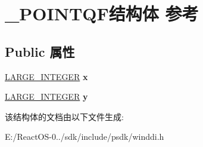 \hypertarget{struct___p_o_i_n_t_q_f}{}\section{\+\_\+\+P\+O\+I\+N\+T\+Q\+F结构体 参考}
\label{struct___p_o_i_n_t_q_f}
\subsection*{Public 属性}
\begin{DoxyCompactItemize}
\item 
\mbox{\label{struct___p_o_i_n_t_q_f_ad7731ff4f41bc4162e21bd167a15c81c}} 
\hyperlink{union___l_a_r_g_e___i_n_t_e_g_e_r}{L\+A\+R\+G\+E\+\_\+\+I\+N\+T\+E\+G\+ER} {\bfseries x}
\item 
\mbox{\label{struct___p_o_i_n_t_q_f_a78fc8f231ae9c21d511b276bef06e2ce}} 
\hyperlink{union___l_a_r_g_e___i_n_t_e_g_e_r}{L\+A\+R\+G\+E\+\_\+\+I\+N\+T\+E\+G\+ER} {\bfseries y}
\end{DoxyCompactItemize}


该结构体的文档由以下文件生成\+:\begin{DoxyCompactItemize}
\item 
E\+:/\+React\+O\+S-\/0../sdk/include/psdk/winddi.\+h\end{DoxyCompactItemize}
